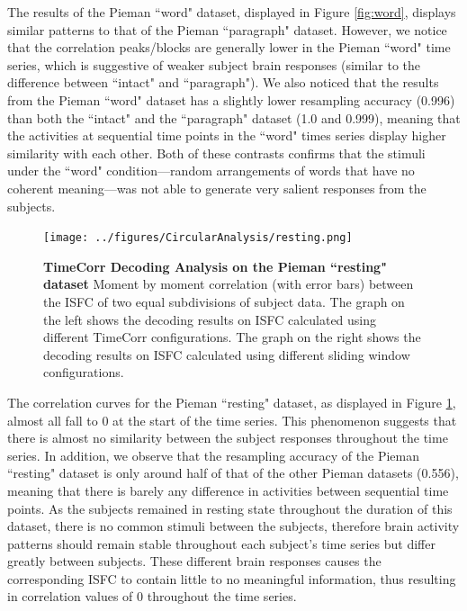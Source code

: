\documentclass[11pt]{article}
\begin{document}
The results of the Pieman ``word" dataset, displayed in Figure \ref{fig:word}, displays similar patterns to that of the Pieman ``paragraph" dataset. However, we notice that the correlation peaks/blocks are generally lower in the Pieman ``word" time series, which is suggestive of weaker subject brain responses (similar to the difference between ``intact" and ``paragraph"). We also noticed that the results from the Pieman ``word" dataset has a slightly lower resampling accuracy (0.996) than both the ``intact" and the ``paragraph" dataset (1.0 and 0.999), meaning that the activities at sequential time points in the ``word" times series display higher similarity with each other. Both of these contrasts confirms that the stimuli under the ``word" condition---random arrangements of words that have no coherent meaning---was not able to generate very salient responses from the subjects.

\begin{figure}[!htb]
\texttt{[image: ../figures/CircularAnalysis/resting.png]}
\caption{\textbf{TimeCorr Decoding Analysis on the Pieman ``resting" dataset} Moment by moment correlation (with error bars) between the ISFC of two equal subdivisions of subject data. The graph on the left shows the decoding results on ISFC calculated using different TimeCorr configurations. The graph on the right shows the decoding results on ISFC calculated using different sliding window configurations.}
\label{fig:resting}
\end{figure}

The correlation curves for the Pieman ``resting" dataset, as displayed in Figure \ref{fig:resting}, almost all fall to 0 at the start of the time series. This phenomenon suggests that there is almost no similarity between the subject responses throughout the time series. In addition, we observe that the resampling accuracy of the Pieman ``resting" dataset is only around half of that of the other Pieman datasets (0.556), meaning that there is barely any difference in activities between sequential time points. As the subjects remained in resting state throughout the duration of this dataset, there is no common stimuli between the subjects, therefore brain activity patterns should remain stable throughout each subject's time series but differ greatly between subjects. These different brain responses causes the corresponding ISFC to contain little to no meaningful information, thus resulting in correlation values of 0 throughout the time series.
\end{document}
